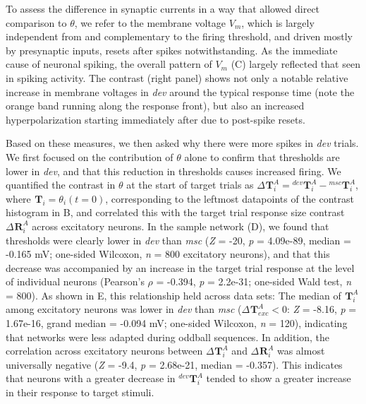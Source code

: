 \documentclass[9pt,lineno,onehalfspacing]{elife}
\newcommand{\dev}{\textit{dev}}
\newcommand{\msc}{\textit{msc}}
\newcommand{\R}[3][]{{}^{#1}_{}\boldsymbol R^{#2}_{#3}}
\newcommand{\T}[3][]{{}^{#1}_{}\boldsymbol T^{#2}_{#3}}
\begin{document}
To assess the difference in synaptic currents in a way that allowed direct comparison to $\theta$, we refer to the membrane voltage $V_m$, which is largely independent from and complementary to the firing threshold, and driven mostly by presynaptic inputs, resets after spikes notwithstanding. As the immediate cause of neuronal spiking, the overall pattern of $V_m$ (C) largely reflected that seen in spiking activity. The contrast (right panel) shows not only a notable relative increase in membrane voltages in \dev{} around the typical response time (note the orange band running along the response front), but also an increased hyperpolarization starting immediately after due to post-spike resets.

Based on these measures, we then asked why there were more spikes in \dev{} trials. We first focused on the contribution of $\theta$ alone to confirm that thresholds are lower in \dev{}, and that this reduction in thresholds causes increased firing. We quantified the contrast in $\theta$ at the start of target trials as $\Delta \T{A}{i} = \T[dev]{A}{i} - \T[msc]{A}{i}$, where $\T{}{i} = \theta_i(t=0)$, corresponding to the leftmost datapoints of the contrast histogram in B, and correlated this with the target trial response size contrast $\Delta \R{A}{i}$ across excitatory neurons. In the sample network (D), we found that thresholds were clearly lower in \dev{} than \msc{} (\textit{Z} = -20, \textit{p} = 4.09e-89, median = -0.165 mV; one-sided Wilcoxon, \textit{n} = 800 excitatory neurons), and that this decrease was accompanied by an increase in the target trial response at the level of individual neurons (Pearson's $\rho$ = -0.394, \textit{p} = 2.2e-31; one-sided Wald test, \textit{n} = 800). As shown in E, this relationship held across data sets: The median of $\T{A}{i}$ among excitatory neurons was lower in \dev{} than \msc{} ($\Delta \T{A}{exc} < 0$: \textit{Z} = -8.16, \textit{p} = 1.67e-16, grand median = -0.094 mV; one-sided Wilcoxon, \textit{n} = 120), indicating that networks were less adapted during oddball sequences. In addition, the correlation across excitatory neurons between $\Delta \T{A}{i}$ and $\Delta \R{A}{i}$ was almost universally negative (\textit{Z} = -9.4, \textit{p} = 2.68e-21, median = -0.357). This indicates that neurons with a greater decrease in $\T[dev]{A}{i}$ tended to show a greater increase in their response to target stimuli.
\end{document}
